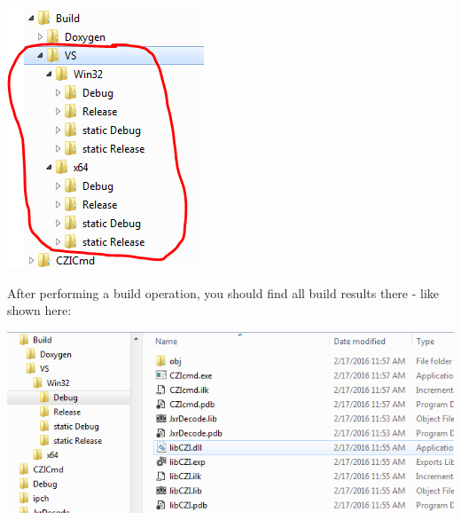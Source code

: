 \begin{DoxyImage}
\includegraphics[width=\textwidth,height=\textheight/2,keepaspectratio=true]{VisualStudioProj_4.PNG}
\end{DoxyImage}
 After performing a build operation, you should find all build results there -\/ like shown here\+:


\begin{DoxyImage}
\includegraphics[width=\textwidth,height=\textheight/2,keepaspectratio=true]{VisualStudioProj_5.PNG}
\end{DoxyImage}

